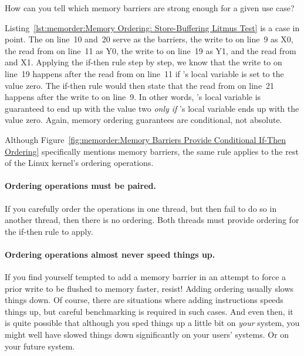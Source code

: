 \QuickQuiz{}
	How can you tell which memory barriers are strong enough for
	a given use case?
 \QuickQuizEnd

Listing~\ref{lst:memorder:Memory Ordering: Store-Buffering Litmus Test}
is a case in point.
The  on line~10 and~20 serve as the barriers,
the write to  on line~9 as X0, the read from  on line~11
as Y0, the write to  on line~19 as Y1, and the read from
 and X1.
Applying the if-then rule step by step, we know that the write to
 on line~19 happens after the read from  on line~11 if
's local variable  is set to the value zero.
The if-then rule would then state that the read from  on
line~21 happens after the write to  on line~9.
In other words,
's local variable  is guaranteed
to end up with the value two \emph{only if}
's local variable  ends up with the value zero.
Again, memory ordering guarantees are conditional, not absolute.

Although
Figure~\ref{fig:memorder:Memory Barriers Provide Conditional If-Then Ordering}
specifically mentions memory barriers, the same rule applies to the
rest of the Linux kernel's ordering operations.

\paragraph{Ordering operations must be paired.}
If you carefully order the operations in one thread, but then fail to do
so in another thread, then there is no ordering.
Both threads must provide ordering for the if-then rule to apply.

\paragraph{Ordering operations almost never speed things up.}
If you find yourself tempted to add a memory barrier in an attempt
to force a prior write to be flushed to memory faster, resist!
Adding ordering usually slows things down.
Of course, there are situations where adding instructions speeds things
up, but careful benchmarking is required in such cases.
And even then, it is quite possible that although you sped things up
a little bit on \emph{your} system, you might well have slowed things
down significantly on your users' systems.
Or on your future system.

